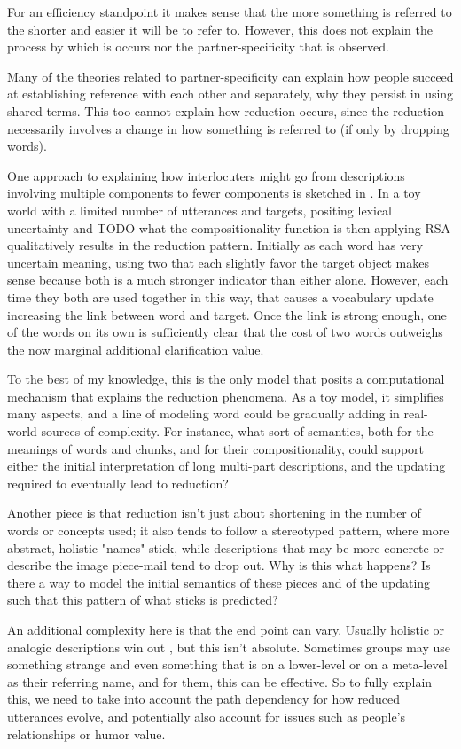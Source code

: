 \documentclass[]{article}
\begin{document}
For an efficiency standpoint it makes sense that the more something is referred to the shorter and easier it will be to refer to. However, this does not explain the process by which is occurs nor the partner-specificity that is observed. 

Many of the theories related to partner-specificity can explain how people succeed at establishing reference with each other and separately, why they persist in using shared terms. This too cannot explain how reduction occurs, since the reduction necessarily involves a change in how something is referred to (if only by dropping words). 

One approach to explaining how interlocuters might go from descriptions involving multiple components to fewer components is sketched in \cite{hawkins2021}. In a toy world with a limited number of utterances and targets, positing lexical uncertainty and TODO what the compositionality function is then applying RSA qualitatively results in the reduction pattern. Initially as each word has very uncertain meaning, using two that each slightly favor the target object makes sense because both is a much stronger indicator than either alone. However, each time they both are used together in this way, that causes a vocabulary update increasing the link between word and target. Once the link is strong enough, one of the words on its own is sufficiently clear that the cost of two words outweighs the now marginal additional clarification value. 

To the best of my knowledge, this is the only model that posits a computational mechanism that explains the reduction phenomena. As a toy model, it simplifies many aspects, and a line of modeling word could be gradually adding in real-world sources of complexity. For instance, what sort of semantics, both for the meanings of words and chunks, and for their compositionality, could support either the initial interpretation of long multi-part descriptions, and the updating required to eventually lead to reduction? 

Another piece is that reduction isn't just about shortening in the number of words or concepts used; it also tends to follow a stereotyped pattern, where more abstract, holistic "names" stick, while descriptions that may be more concrete or describe the image piece-mail tend to drop out. Why is this what happens?  Is there a way to model the initial semantics of these pieces and of the updating such that this pattern of what sticks is predicted? 

An additional complexity here is that the end point can vary. Usually holistic or analogic descriptions win out \cite{clark1986}, but this isn't absolute. Sometimes groups may use something strange and even something that is on a lower-level or on a meta-level as their referring name, and for them, this can be effective. So to fully explain this, we need to take into account the path dependency for how reduced utterances evolve, and potentially also account for issues such as people's relationships or humor value. 
\end{document}
